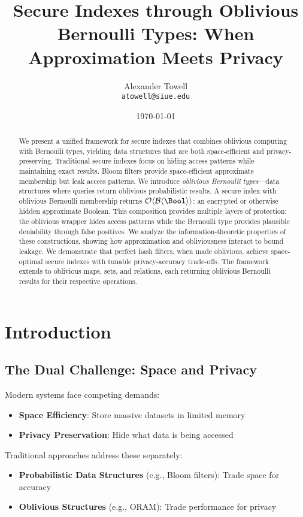 \documentclass[11pt,final,hidelinks]{article}
\title{Secure Indexes through Oblivious Bernoulli Types: When Approximation Meets Privacy}
\author{
    Alexander Towell\\
    \texttt{atowell@siue.edu}
}
\date{\today}
\newcommand{\BernBool}{\mathcal{B}\langle \Bool \rangle}
\begin{document}
\maketitle

\begin{abstract}
We present a unified framework for secure indexes that combines oblivious computing with Bernoulli types, yielding data structures that are both space-efficient and privacy-preserving. Traditional secure indexes focus on hiding access patterns while maintaining exact results. Bloom filters provide space-efficient approximate membership but leak access patterns. We introduce \emph{oblivious Bernoulli types}—data structures where queries return oblivious probabilistic results. A secure index with oblivious Bernoulli membership returns $\Obv{\BernBool}$: an encrypted or otherwise hidden approximate Boolean. This composition provides multiple layers of protection: the oblivious wrapper hides access patterns while the Bernoulli type provides plausible deniability through false positives. We analyze the information-theoretic properties of these constructions, showing how approximation and obliviousness interact to bound leakage. We demonstrate that perfect hash filters, when made oblivious, achieve space-optimal secure indexes with tunable privacy-accuracy trade-offs. The framework extends to oblivious maps, sets, and relations, each returning oblivious Bernoulli results for their respective operations.
\end{abstract}

\ObliviousNotationGuide

\section{Introduction}

\subsection{The Dual Challenge: Space and Privacy}

Modern systems face competing demands:
\begin{itemize}
    \item \textbf{Space Efficiency}: Store massive datasets in limited memory
    \item \textbf{Privacy Preservation}: Hide what data is being accessed
\end{itemize}

Traditional approaches address these separately:
\begin{itemize}
    \item \textbf{Probabilistic Data Structures} (e.g., Bloom filters): Trade space for accuracy
    \item \textbf{Oblivious Structures} (e.g., ORAM): Trade performance for privacy
\end{itemize}
\end{document}
